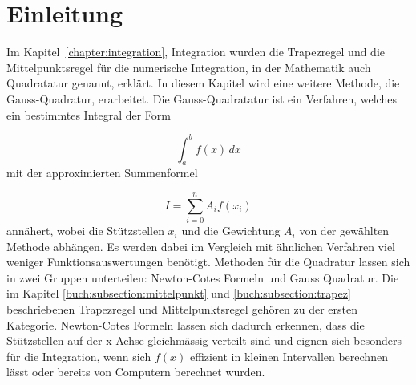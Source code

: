 %
%
%
\section{Einleitung\label{quadratur:section:einleitung}}

Im Kapitel~\ref{chapter:integration}, Integration wurden die 
Trapezregel und die Mittelpunktsregel für die numerische Integration, 
in der Mathematik auch Quadratatur genannt, erklärt. 
In diesem Kapitel wird eine weitere Methode, die Gauss-Quadratur, erarbeitet.
\noindent
Die Gauss-Quadratatur ist ein Verfahren, welches ein bestimmtes Integral der Form

\begin{equation}
    \int_{a}^{b} f(x) \,dx
\end{equation}
\noindent
mit der approximierten Summenformel 

\begin{equation}
    I = \sum_{i=0}^{n} A_i f(x_i)
\end{equation}
\noindent
annähert, wobei die Stützstellen $x_i$ und die Gewichtung $A_i$ von der gewählten 
Methode abhängen. 
Es werden dabei im Vergleich mit ähnlichen Verfahren viel weniger Funktionsauswertungen benötigt.
\noindent
Methoden für die Quadratur lassen sich in zwei Gruppen unterteilen: 
Newton-Cotes Formeln und Gauss Quadratur.
Die im Kapitel \ref{buch:subsection:mittelpunkt} und \ref{buch:subsection:trapez} beschriebenen
Trapezregel und Mittelpunktsregel gehören zu der ersten Kategorie.
Newton-Cotes Formeln lassen sich dadurch erkennen, dass die Stützstellen auf der x-Achse 
gleichmässig verteilt sind und eignen sich besonders für die Integration, wenn sich $f(x)$ 
effizient in kleinen Intervallen berechnen lässt oder bereits von Computern berechnet wurden.

\newpage





